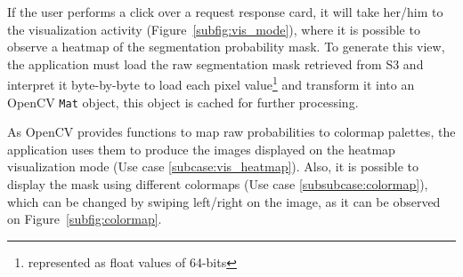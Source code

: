 If the user performs a click over a request response card, it will take her/him to the visualization activity (Figure~\ref{subfig:vis_mode}), where it is possible to observe a heatmap of the segmentation probability mask. To generate this view, the application must load the raw segmentation mask retrieved from S3 and interpret it byte-by-byte to load each pixel value\footnote{represented as float values of 64-bits} and transform it into an OpenCV \texttt{Mat} object, this object is cached for further processing. 

As OpenCV provides functions to map raw probabilities to colormap palettes, the application uses them to produce the images displayed on the heatmap visualization mode (Use case \ref{subcase:vis_heatmap}). Also, it is possible to display the mask using different colormaps (Use case \ref{subsubcase:colormap}), which can be changed by swiping left/right on the image, as it can be observed on Figure~\ref{subfig:colormap}.

